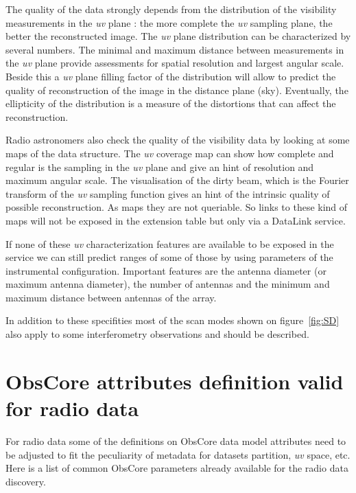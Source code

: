 \documentclass[11pt,a4paper]{ivoa}
\begin{document}
The quality of the data strongly depends from the distribution of the visibility measurements
in the \emph{uv} plane : the more complete the \emph{uv} sampling plane, the better the reconstructed image.
The \emph{uv} plane distribution can be characterized by several numbers.
The minimal and maximum distance between measurements in the \emph{uv} plane provide assessments for
spatial resolution and largest angular scale.
Beside this a \emph{uv} plane filling factor of the distribution will allow to predict the quality
of reconstruction of the image in the distance plane (sky).
Eventually, the ellipticity of the distribution is a measure of the distortions that can
affect the reconstruction.

Radio astronomers also check the quality of the visibility data by looking at some maps of
the data structure. The \emph{uv} coverage map can show how complete and regular is the sampling in
the \emph{uv} plane and give an hint of resolution and maximum angular scale.
The visualisation of the dirty beam, which is the Fourier transform of the \emph{uv} sampling
function gives an hint of the intrinsic quality of possible reconstruction. As maps they are
not queriable. So links to these kind of maps will not be exposed in the extension
table but only via a DataLink service.

If none of these \emph{uv} characterization features are available to be exposed in the service
we can still predict ranges of some of those by using parameters of the instrumental configuration. 
Important features are the antenna diameter (or maximum antenna diameter), the number of
antennas and the minimum and maximum distance between antennas of the array.

In addition to these specifities most of the scan modes shown on figure~\ref{fig:SD} also
apply to some interferometry observations and should be described.

\section{ObsCore attributes definition valid for radio data}
\label{sec:ObsCoreRadDef}

For radio data some of the definitions on ObsCore data model attributes need to be adjusted
to fit the peculiarity of metadata for datasets partition, \emph{uv} space, etc.
Here is a list of common ObsCore parameters already available for the radio data discovery.
\end{document}
